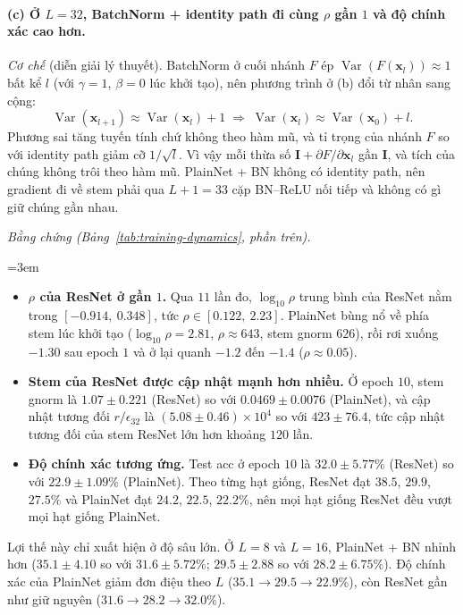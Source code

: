 \paragraph{(c) Ở $L=32$, BatchNorm + identity path đi cùng $\rho$ gần $1$ và
độ chính xác cao hơn.}
\emph{Cơ chế} (diễn giải lý thuyết). BatchNorm ở cuối nhánh $F$ ép
$\operatorname{Var}(F(\mathbf{x}_l))\approx1$ bất kể $l$ (với $\gamma=1$,
$\beta=0$ lúc khởi tạo), nên phương trình ở (b) đổi từ nhân sang cộng:
\[
  \operatorname{Var}(\mathbf{x}_{l+1}) \approx \operatorname{Var}(\mathbf{x}_l) + 1
  \;\Longrightarrow\;
  \operatorname{Var}(\mathbf{x}_l) \approx \operatorname{Var}(\mathbf{x}_0) + l .
\]
Phương sai tăng tuyến tính chứ không theo hàm mũ, và tỉ trọng của nhánh $F$
so với identity path giảm cỡ $1/\sqrt{l}$. Vì vậy mỗi thừa số
$\mathbf{I}+\partial F/\partial\mathbf{x}_l$ gần $\mathbf{I}$, và tích của chúng
không trôi theo hàm mũ. PlainNet + BN không có identity path, nên gradient đi về
stem phải qua $L+1=33$ cặp BN--ReLU nối tiếp và không có gì giữ chúng gần
nhau.

\emph{Bằng chứng (Bảng~\ref{tab:training-dynamics}, phần trên).}
{\emergencystretch=3em
\begin{itemize}[leftmargin=*, itemsep=1pt]
  \item \textbf{$\rho$ của ResNet ở gần $1$.} Qua $11$ lần đo, $\log_{10}\rho$
    trung bình của ResNet nằm trong $[-0.914,\ 0.348]$, tức $\rho\in[0.122,\ 2.23]$.
    PlainNet bùng nổ về phía stem lúc khởi tạo ($\log_{10}\rho=2.81$,
    $\rho\approx643$, stem gnorm $626$), rồi rơi xuống $-1.30$ sau epoch $1$ và
    ở lại quanh $-1.2$ đến $-1.4$ ($\rho\approx0.05$).
  \item \textbf{Stem của ResNet được cập nhật mạnh hơn nhiều.} Ở epoch $10$,
    stem gnorm là $1.07\pm0.221$ (ResNet) so với $0.0469\pm0.0076$ (PlainNet),
    và cập nhật tương đối $r/\epsilon_{32}$ là $(5.08\pm0.46)\times10^{4}$ so với
    $423\pm76.4$, tức cập nhật tương đối của stem ResNet lớn hơn khoảng $120$ lần.
  \item \textbf{Độ chính xác tương ứng.} Test acc ở epoch $10$ là
    $32.0\pm5.77\%$ (ResNet) so với $22.9\pm1.09\%$ (PlainNet). Theo từng hạt
    giống, ResNet đạt $38.5$, $29.9$, $27.5\%$ và PlainNet đạt $24.2$, $22.5$,
    $22.2\%$, nên mọi hạt giống ResNet đều vượt mọi hạt giống PlainNet.
\end{itemize}}
Lợi thế này chỉ xuất hiện ở độ sâu lớn. Ở $L=8$ và $L=16$, PlainNet + BN nhỉnh
hơn ($35.1\pm4.10$ so với $31.6\pm5.72\%$; $29.5\pm2.88$ so với $28.2\pm6.75\%$).
Độ chính xác của PlainNet giảm đơn điệu theo $L$ ($35.1\to29.5\to22.9\%$), còn
ResNet gần như giữ nguyên ($31.6\to28.2\to32.0\%$).

